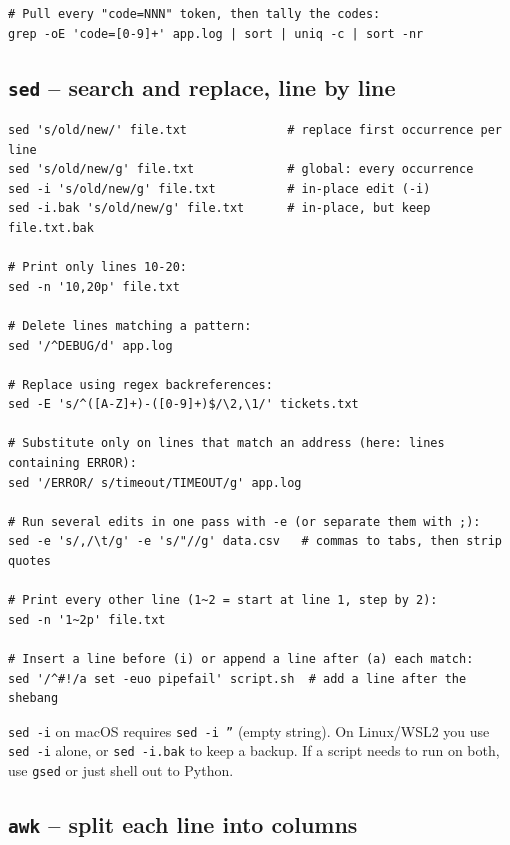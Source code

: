 \documentclass[11pt,a4paper]{article}
\begin{document}
\begin{lstlisting}[style=bashstyle]
# Pull every "code=NNN" token, then tally the codes:
grep -oE 'code=[0-9]+' app.log | sort | uniq -c | sort -nr
\end{lstlisting}

\subsection*{\texttt{sed} -- search and replace, line by line}

\begin{lstlisting}[style=bashstyle]
sed 's/old/new/' file.txt              # replace first occurrence per line
sed 's/old/new/g' file.txt             # global: every occurrence
sed -i 's/old/new/g' file.txt          # in-place edit (-i)
sed -i.bak 's/old/new/g' file.txt      # in-place, but keep file.txt.bak

# Print only lines 10-20:
sed -n '10,20p' file.txt

# Delete lines matching a pattern:
sed '/^DEBUG/d' app.log

# Replace using regex backreferences:
sed -E 's/^([A-Z]+)-([0-9]+)$/\2,\1/' tickets.txt

# Substitute only on lines that match an address (here: lines containing ERROR):
sed '/ERROR/ s/timeout/TIMEOUT/g' app.log

# Run several edits in one pass with -e (or separate them with ;):
sed -e 's/,/\t/g' -e 's/"//g' data.csv   # commas to tabs, then strip quotes

# Print every other line (1~2 = start at line 1, step by 2):
sed -n '1~2p' file.txt

# Insert a line before (i) or append a line after (a) each match:
sed '/^#!/a set -euo pipefail' script.sh  # add a line after the shebang
\end{lstlisting}

\begin{gotcha}
\texttt{sed -i} on macOS requires \texttt{sed -i ''} (empty string).
On Linux/WSL2 you use \texttt{sed -i} alone, or \texttt{sed -i.bak}
to keep a backup. If a script needs to run on both, use \texttt{gsed}
or just shell out to Python.
\end{gotcha}

\subsection*{\texttt{awk} -- split each line into columns}
\end{document}
